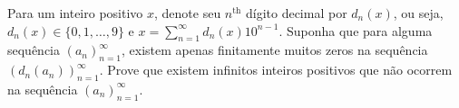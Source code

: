 Para um inteiro positivo \(x\), denote seu \(n^{\mathrm{th}}\) dígito decimal por \(d_n(x)\), ou seja, \(d_n(x)\in \{ 0,1, \dots, 9\}\) e \(x=\sum_{n=1}^{\infty} d_n(x)10^{n-1}\). Suponha que para alguma sequência \((a_n)_{n=1}^{\infty}\), existem apenas finitamente muitos zeros na sequência \((d_n(a_n))_{n=1}^{\infty}\). Prove que existem infinitos inteiros positivos que não ocorrem na sequência \((a_n)_{n=1}^{\infty}\).
